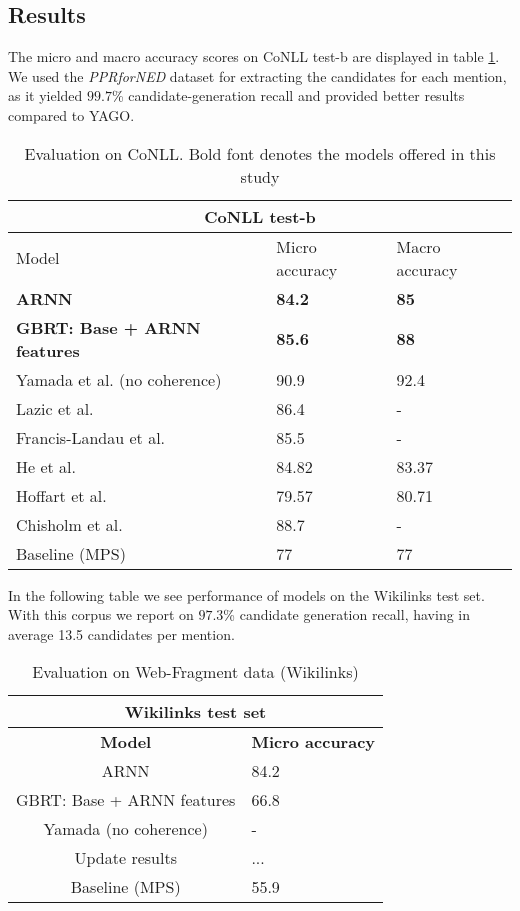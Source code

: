 \documentclass[11pt]{article}
\begin{document}
	\subsection{Results}
	
	The micro and macro accuracy scores on CoNLL test-b are displayed in table \ref{tab:a}. We used the \textit{PPRforNED} dataset \cite{Pershina2015} for extracting the candidates for each mention, as it yielded $99.7$\% candidate-generation recall and provided better results compared to YAGO. 
	
	
	\begin{table}[h]
		\begin{center}
			\begin{tabular}{|p{3.5cm}| p{1.5cm} p{1.5cm}|}
				\hline \multicolumn{3}{|c|}{CoNLL test-b} \\
				\hline Model & Micro     accuracy & Macro     accuracy \\ \hline
				\bf ARNN  & \bf 84.2 & \bf 85 \\
				\bf GBRT: Base + ARNN features & \bf 85.6 & \bf 88 \\
				Yamada et al. (no coherence) & 90.9 & 92.4 \\
				Lazic et al. & 86.4 & - \\
				Francis-Landau et al. & 85.5 & - \\
				He et al. & 84.82 & 83.37 \\	
				Hoffart et al. & 79.57 & 80.71 \\
				Chisholm et al. & 88.7 & - \\			
				Baseline (MPS) & 77 & 77 \\
				\hline
			\end{tabular}
		\end{center}
		\caption{\label{tab:a} Evaluation on CoNLL. Bold font denotes the models offered in this study}
	\end{table}

	In the following table we see performance of models on the Wikilinks test set. With this corpus we report on $97.3$\% candidate generation recall, having in average 13.5 candidates per mention.
	 
	\begin{table}[h]
	\begin{center}
		\begin{tabular}{|c| p{1.5cm}|}
			\hline \multicolumn{2}{|c|}{Wikilinks test set} \\
			\hline \bf Model & \bf Micro     accuracy  \\ \hline
			ARNN  & 84.2\\
			GBRT: Base + ARNN features & 66.8 \\
			Yamada (no coherence) & -  \\
			Update results & ... \\
			Baseline (MPS) & 55.9 \\
			\hline
		\end{tabular}
	\end{center}
	\caption{\label{tab:b} Evaluation on Web-Fragment data (Wikilinks)}
	\end{table}
\end{document}
